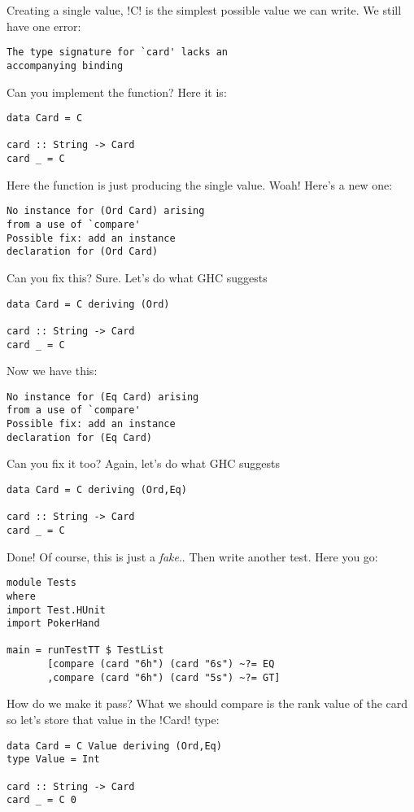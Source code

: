 Creating a single value, \il!C! is the simplest possible value we can write.
\lhN \error We still have one error: 
\begin{verbatim}
The type signature for `card' lacks an 
accompanying binding
\end{verbatim}
Can you implement the function?
\lhA \error Here it is:
\begin{lstlisting}[frame=single]
data Card = C 

card :: String -> Card
card _ = C
\end{lstlisting}
Here the function is just producing the single value.
\lhN \error Woah! Here's a new one:
\begin{verbatim}
No instance for (Ord Card) arising 
from a use of `compare' 
Possible fix: add an instance 
declaration for (Ord Card)
\end{verbatim}
Can you fix this?
\lhA \error Sure. Let's do what GHC suggests
\begin{lstlisting}[frame=single]
data Card = C deriving (Ord)

card :: String -> Card
card _ = C
\end{lstlisting}
\lhN \error Now we have this:
\begin{verbatim}
No instance for (Eq Card) arising 
from a use of `compare' 
Possible fix: add an instance 
declaration for (Eq Card)
\end{verbatim}
Can you fix it too?
\lhA \error Again, let's do what GHC suggests 
\begin{lstlisting}[frame=single]
data Card = C deriving (Ord,Eq)

card :: String -> Card
card _ = C
\end{lstlisting}
\success Done!
\lhN Of course, this is just a \emph{fake}..
\lhA Then write another test.
\lhN Here you go:
\begin{lstlisting}[frame=single]
module Tests
where 
import Test.HUnit
import PokerHand

main = runTestTT $ TestList 
       [compare (card "6h") (card "6s") ~?= EQ
       ,compare (card "6h") (card "5s") ~?= GT]
\end{lstlisting} %
How do we make it pass?
\lhA \error What we should compare is the rank value of the card so let's store that value in the \il!Card! type:
\begin{lstlisting}[frame=single]
data Card = C Value deriving (Ord,Eq)
type Value = Int

card :: String -> Card
card _ = C 0
\end{lstlisting}
